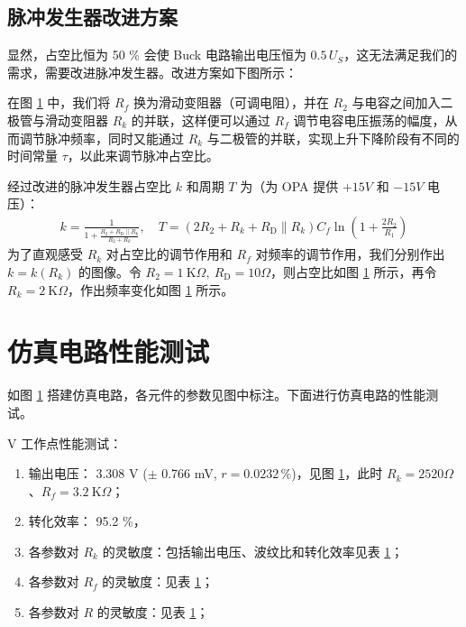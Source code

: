 \documentclass[UTF8]{report}
\def\kO{\ \mathrm{K}\Omega}
\def\KO{\ \mathrm{K}\Omega}
\theoremstyle{MyLineTheoremStyle} %
\theoremstyle{MyBlockTheoremStyle} %
\theoremstyle{MySubsubsectionStyle} %
\begin{document}
\subsection{脉冲发生器改进方案}

显然，占空比恒为 50 \% 会使 Buck 电路输出电压恒为 $0.5 \,U_S$，这无法满足我们的需求，需要改进脉冲发生器。改进方案如下图所示：
\begin{figure}[H]\centering
    \caption{}
\end{figure}
在图 \ref{} 中，我们将 $R_f$ 换为滑动变阻器（可调电阻），并在 $R_2$ 与电容之间加入二极管与滑动变阻器 $R_k$ 的并联，这样便可以通过 $R_f$ 调节电容电压振荡的幅度，从而调节脉冲频率，同时又能通过 $R_k$ 与二极管的并联，实现上升下降阶段有不同的时间常量 $\tau$，以此来调节脉冲占空比。

经过改进的脉冲发生器占空比 $k$ 和周期 $T$ 为（为 OPA 提供 $+15 V$ 和 $-15 V$ 电压）：
\begin{gather}
k = \frac{1}{1 + \frac{R_2 +  R_\text{D} \parallel R_k}{R_2 + R_k}},\quad 
T = \left( 2R_2 + R_k + R_\text{D} \parallel R_k \right)C_f \ln \left(1 + \frac{2 R_2}{R_1}\right)
\end{gather}
为了直观感受 $R_k$ 对占空比的调节作用和 $R_f$ 对频率的调节作用，我们分别作出 $k = k(R_k)$ 的图像。令 $R_2 = 1\kO,\ R_\text{D} = 10 \Omega$，则占空比如图 \ref{} 所示，再令 $R_k = 2 \KO$，作出频率变化如图 \ref{} 所示。
\begin{figure}[H]\centering
\begin{subfigure}[b]{0.5\columnwidth}\centering
    \caption{}
\end{subfigure}\hfill
\begin{subfigure}[b]{0.5\columnwidth}\centering
    \caption{}
\end{subfigure}
\caption{}
\end{figure}


\section{仿真电路性能测试}
如图 \ref{} 搭建仿真电路，各元件的参数见图中标注。下面进行仿真电路的性能测试。

 V 工作点性能测试：
\begin{enumerate}
\item 输出电压： 3.308 V ($\pm$ 0.766 mV, $r = 0.0232 \,\%$)，见图 \ref{}，此时 $R_k = 2520 \Omega$、$R_f =  3.2\KO$；
\item 转化效率： 95.2 \%，
\item 各参数对 $R_k$ 的灵敏度：包括输出电压、波纹比和转化效率见表 \ref{}；
\item 各参数对 $R_f$ 的灵敏度：见表 \ref{}；
\item 各参数对 $R$ 的灵敏度：见表 \ref{}；
\end{enumerate}
\end{document}
